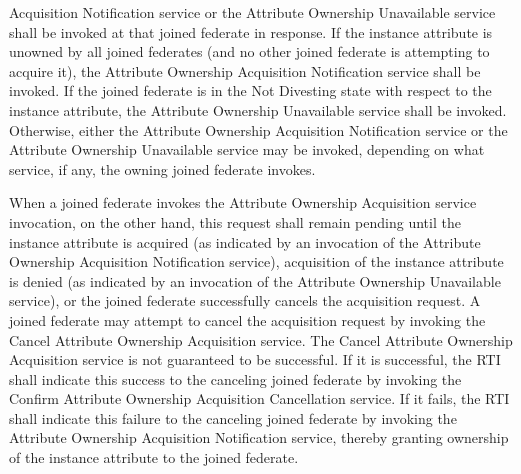 \begin{compactstdpage}

    Acquisition Notification \rtiinitiated{} service or the Attribute Ownership Unavailable \rtiinitiated{} service shall be invoked at that joined federate in response. If the instance attribute is unowned by all joined federates (and no other joined federate is attempting to acquire it), the Attribute Ownership Acquisition Notification \rtiinitiated{} service shall be invoked. If the joined federate is in the Not Divesting state with respect to the instance attribute, the Attribute Ownership Unavailable \rtiinitiated{} service shall be invoked. Otherwise, either the Attribute Ownership Acquisition Notification \rtiinitiated{} service or the Attribute Ownership Unavailable \rtiinitiated{} service may be invoked, depending on what service, if any, the owning joined federate invokes.


    When a joined federate invokes the Attribute Ownership Acquisition service invocation, on the other hand, this request shall remain pending until the instance attribute is acquired (as indicated by an invocation of the Attribute Ownership Acquisition Notification \rtiinitiated{} service), acquisition of the instance attribute is denied (as indicated by an invocation of the Attribute Ownership Unavailable \rtiinitiated{} service), or the joined federate successfully cancels the acquisition request. A joined federate may attempt to cancel the acquisition request by invoking the Cancel Attribute Ownership Acquisition service. The Cancel Attribute Ownership Acquisition service is not guaranteed to be successful. If it is successful, the RTI shall indicate this success to the canceling joined federate by invoking the Confirm Attribute Ownership Acquisition Cancellation \rtiinitiated{} service. If it fails, the RTI shall indicate this failure to the canceling joined federate by invoking the Attribute Ownership Acquisition Notification \rtiinitiated{} service, thereby granting ownership of the instance attribute to the joined federate.



\end{compactstdpage}
